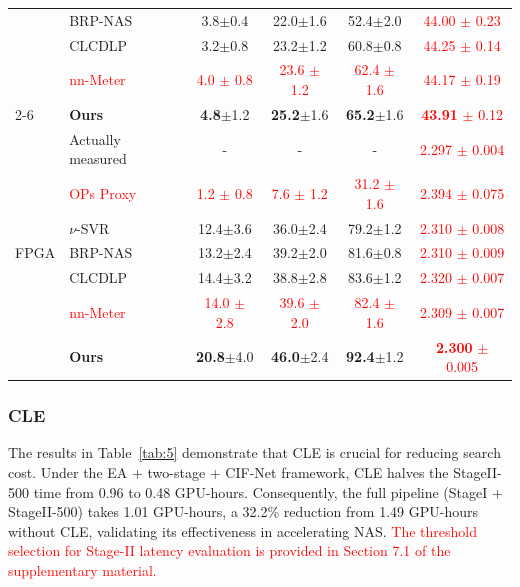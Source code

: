 \documentclass[a4paper,fleqn]{cas-sc}
\begin{document}
\begin{table}[ht]
\begin{tabular}{llcccc}
    \multicolumn{1}{l}{} &BRP-NAS~\cite{Dudziak2020}      & 3.8$\pm$0.4 & 22.0$\pm$1.6 & 52.4$\pm$2.0 & \textcolor{red}{44.00 $\pm$ 0.23} \\
    \multicolumn{1}{l}{} &CLCDLP~\cite{Lin2024}       & 3.2$\pm$0.8 & 23.2$\pm$1.2 & 60.8$\pm$0.8 & \textcolor{red}{44.25 $\pm$ 0.14} \\
    \multicolumn{1}{l}{} &\textcolor{red}{nn-Meter~\cite{Zhang2021nnMeter}} & \textcolor{red}{4.0 $\pm$ 0.8} & \textcolor{red}{23.6 $\pm$ 1.2} & \textcolor{red}{62.4 $\pm$ 1.6} & \textcolor{red}{44.17 $\pm$ 0.19} \\
    \cline{2-6}
    \multicolumn{1}{l}{} &\textbf{Ours}& \textbf{4.8}$\pm$1.2 & \textbf{25.2}$\pm$1.6 & \textbf{65.2}$\pm$1.6 & \textcolor{red}{\textbf{43.91} $\pm$ 0.12} \\
    \midrule
    \multicolumn{1}{l}{\multirow{7}{*}{FPGA}} & Actually measured    & - & - & - & \textcolor{red}{2.297 $\pm$ 0.004} \\
    \multicolumn{1}{l}{} &\textcolor{red}{OPs Proxy} & \textcolor{red}{1.2 $\pm$ 0.8} & \textcolor{red}{7.6 $\pm$ 1.2} & \textcolor{red}{31.2 $\pm$ 1.6} & \textcolor{red}{2.394 $\pm$ 0.075} \\
    \multicolumn{1}{l}{} &$\nu$-SVR~\cite{Baker2017}      & 12.4$\pm$3.6 & 36.0$\pm$2.4 & 79.2$\pm$1.2 & \textcolor{red}{2.310 $\pm$ 0.008} \\
    \multicolumn{1}{l}{} &BRP-NAS~\cite{Dudziak2020}      & 13.2$\pm$2.4 & 39.2$\pm$2.0 & 81.6$\pm$0.8 & \textcolor{red}{2.310 $\pm$ 0.009} \\
    \multicolumn{1}{l}{} &CLCDLP~\cite{Lin2024}       & 14.4$\pm$3.2 & 38.8$\pm$2.8 & 83.6$\pm$1.2 & \textcolor{red}{2.320 $\pm$ 0.007} \\
    \multicolumn{1}{l}{} &\textcolor{red}{nn-Meter~\cite{Zhang2021nnMeter}} & \textcolor{red}{14.0 $\pm$ 2.8} & \textcolor{red}{39.6 $\pm$ 2.0} & \textcolor{red}{82.4 $\pm$ 1.6} & \textcolor{red}{2.309 $\pm$ 0.007} \\
    \cline{2-6}
    \multicolumn{1}{l}{} &\textbf{Ours}& \textbf{20.8}$\pm$4.0 & \textbf{46.0}$\pm$2.4 & \textbf{92.4}$\pm$1.2  & \textcolor{red}{\textbf{2.300} $\pm$ 0.005} \\
    \bottomrule[1.5pt]
    \end{tabular}
    \label{tab:7}
\end{table}

\subsubsection{CLE}
The results in Table~\ref{tab:5} demonstrate that CLE is crucial for reducing search cost.
Under the EA + two-stage + CIF-Net framework, CLE halves the StageII-500 time from 0.96 to 0.48 GPU-hours.
Consequently, the full pipeline (StageI + StageII-500) takes 1.01 GPU-hours, a 32.2\% reduction from 1.49 GPU-hours without CLE, validating its effectiveness in accelerating NAS. \textcolor{red}{The threshold selection for Stage-II latency evaluation is provided in Section 7.1 of the supplementary material.}
\end{document}
